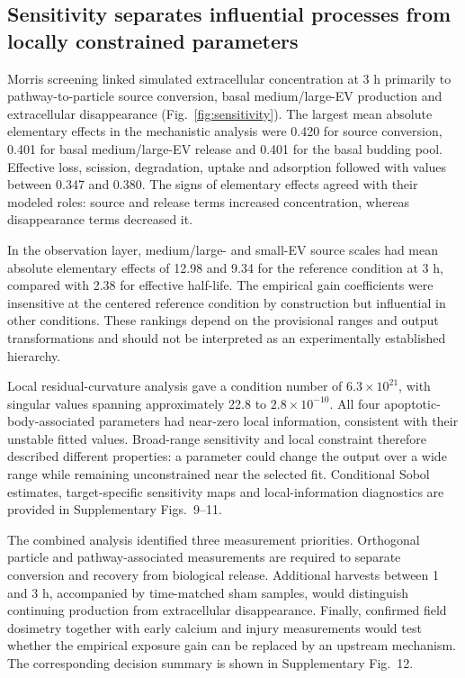 \subsection*{Sensitivity separates influential processes from locally constrained parameters}

Morris screening linked simulated extracellular concentration at 3 h primarily to pathway-to-particle source conversion, basal medium/large-EV production and extracellular disappearance (Fig.~\ref{fig:sensitivity}). The largest mean absolute elementary effects in the mechanistic analysis were 0.420 for source conversion, 0.401 for basal medium/large-EV release and 0.401 for the basal budding pool. Effective loss, scission, degradation, uptake and adsorption followed with values between 0.347 and 0.380. The signs of elementary effects agreed with their modeled roles: source and release terms increased concentration, whereas disappearance terms decreased it.

In the observation layer, medium/large- and small-EV source scales had mean absolute elementary effects of 12.98 and 9.34 for the reference condition at 3 h, compared with 2.38 for effective half-life. The empirical gain coefficients were insensitive at the centered reference condition by construction but influential in other conditions. These rankings depend on the provisional ranges and output transformations and should not be interpreted as an experimentally established hierarchy.

Local residual-curvature analysis gave a condition number of $6.3\times10^{21}$, with singular values spanning approximately 22.8 to $2.8\times10^{-10}$. All four apoptotic-body-associated parameters had near-zero local information, consistent with their unstable fitted values. Broad-range sensitivity and local constraint therefore described different properties: a parameter could change the output over a wide range while remaining unconstrained near the selected fit. Conditional Sobol estimates, target-specific sensitivity maps and local-information diagnostics are provided in Supplementary Figs.~9--11.

The combined analysis identified three measurement priorities. Orthogonal particle and pathway-associated measurements are required to separate conversion and recovery from biological release. Additional harvests between 1 and 3 h, accompanied by time-matched sham samples, would distinguish continuing production from extracellular disappearance. Finally, confirmed field dosimetry together with early calcium and injury measurements would test whether the empirical exposure gain can be replaced by an upstream mechanism. The corresponding decision summary is shown in Supplementary Fig.~12.

